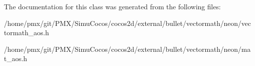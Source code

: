 The documentation for this class was generated from the following files\+:\begin{DoxyCompactItemize}
\item 
/home/pmx/git/\+P\+M\+X/\+Simu\+Cocos/cocos2d/external/bullet/vectormath/neon/vectormath\+\_\+aos.\+h\item 
/home/pmx/git/\+P\+M\+X/\+Simu\+Cocos/cocos2d/external/bullet/vectormath/neon/mat\+\_\+aos.\+h\end{DoxyCompactItemize}
